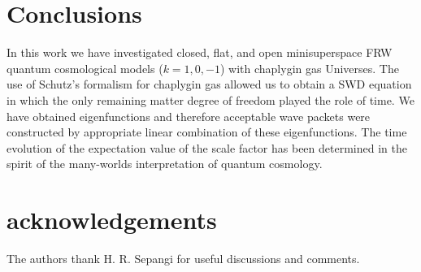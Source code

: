 \section{Conclusions}
In this work we have investigated closed, flat, and open
minisuperspace FRW quantum cosmological models ($k=1,0,-1$) with
chaplygin gas Universes. The use of Schutz's formalism for chaplygin
gas allowed us to obtain a SWD equation in which the only remaining
matter degree of freedom played the role of time. We have obtained
eigenfunctions and therefore acceptable wave packets were
constructed by appropriate linear combination of these
eigenfunctions. The time evolution of the expectation value of the
scale factor has been determined in the spirit of the many-worlds
interpretation of quantum cosmology.
\section*{acknowledgements}
The authors thank H. R. Sepangi for useful discussions and comments.

